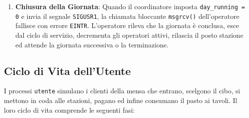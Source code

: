 \documentclass[a4paper,12pt]{article}
\begin{document}
\begin{enumerate}
\begin{enumerate}[label=\alph*)]
      \item \textbf{Erogazione Caffè e Cassa}: Nel caso del caffè (porzioni illimitate) o della cassa, l'operatore simula il servizio e risponde sempre con successo. Per la cassa, l'operatore calcola inoltre l'importo totale dovuto basandosi sui piatti consumati dal cliente ed aggiorna in mutua esclusione la statistica degli incassi giornalieri.
      \item \textbf{Invio Risposta}: La risposta (\texttt{ServedMsg}) viene inviata sulla coda di risposta comune con tipo di messaggio (\texttt{mtype}) impostato al PID dell'utente richiedente.
      \item \textbf{Gestione delle Pause}: Dopo ogni servizio completato, l'operatore calcola una probabilità del 15\% di prendere una pausa. La pausa è consentita solo se ci sono ancora pause disponibili nella sua quota giornaliera (\texttt{nof\_pause > 0}) e se la stazione non viene lasciata sguarnita (ovvero se vi è almeno un altro operatore attivo nella medesima stazione). Durante la pausa, l'operatore decrementa il contatore degli operatori attivi in shared memory, rilascia temporaneamente il posto fisico della stazione (\texttt{sem\_op(+1)} sul relativo semaforo), simula la pausa (\texttt{WORKER\_PAUSE} minuti simulati) e infine riacquisisce il posto (\texttt{sem\_op(-1)}) ed aggiorna lo stato.
    \end{enumerate}
  \item \textbf{Chiusura della Giornata}: Quando il coordinatore imposta \texttt{day\_running = 0} e invia il segnale \texttt{SIGUSR1}, la chiamata bloccante \texttt{msgrcv()} dell'operatore fallisce con errore \texttt{EINTR}. L'operatore rileva che la giornata è conclusa, esce dal ciclo di servizio, decrementa gli operatori attivi, rilascia il posto stazione ed attende la giornata successiva o la terminazione.
\end{enumerate}

\subsection{Ciclo di Vita dell'Utente}

I processi \texttt{utente} simulano i clienti della mensa che entrano, scelgono il cibo, si mettono in coda alle stazioni, pagano ed infine consumano il pasto ai tavoli. Il loro ciclo di vita comprende le seguenti fasi:
\end{document}
